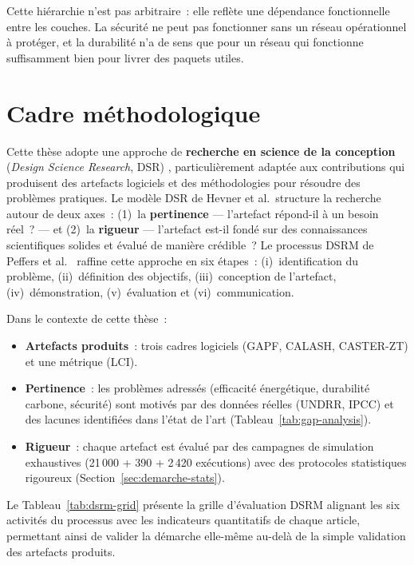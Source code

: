 Cette hiérarchie n'est pas arbitraire~: elle reflète une dépendance fonctionnelle entre les couches. La sécurité ne peut pas fonctionner sans un réseau opérationnel à protéger, et la durabilité n'a de sens que pour un réseau qui fonctionne suffisamment bien pour livrer des paquets utiles.


\section{Cadre méthodologique}\label{sec:demarche-cadre}

Cette thèse adopte une approche de \textbf{recherche en science de la conception} (\emph{Design Science Research}, DSR) \cite{Hevner2004DesignScience, Peffers2007DSRM}, particulièrement adaptée aux contributions qui produisent des artefacts logiciels et des méthodologies pour résoudre des problèmes pratiques. Le modèle DSR de Hevner et al.\ structure la recherche autour de deux axes~: (1)~la \textbf{pertinence} --- l'artefact répond-il à un besoin réel~? --- et (2)~la \textbf{rigueur} --- l'artefact est-il fondé sur des connaissances scientifiques solides et évalué de manière crédible~? Le processus DSRM de Peffers et al.\ \cite{Peffers2007DSRM} raffine cette approche en six étapes~: (i)~identification du problème, (ii)~définition des objectifs, (iii)~conception de l'artefact, (iv)~démonstration, (v)~évaluation et (vi)~communication.

Dans le contexte de cette thèse~:
\begin{itemize}
    \item \textbf{Artefacts produits}~: trois cadres logiciels (GAPF, CALASH, CASTER-ZT) et une métrique (LCI).
    \item \textbf{Pertinence}~: les problèmes adressés (efficacité énergétique, durabilité carbone, sécurité) sont motivés par des données réelles (UNDRR, IPCC) et des lacunes identifiées dans l'état de l'art (Tableau~\ref{tab:gap-analysis}).
    \item \textbf{Rigueur}~: chaque artefact est évalué par des campagnes de simulation exhaustives (21\,000 + 390 + 2\,420 exécutions) avec des protocoles statistiques rigoureux (Section~\ref{sec:demarche-stats}).
\end{itemize}

\noindent Le Tableau~\ref{tab:dsrm-grid} présente la grille d'évaluation DSRM alignant les six activités du processus avec les indicateurs quantitatifs de chaque article, permettant ainsi de valider la démarche elle-même au-delà de la simple validation des artefacts produits.

